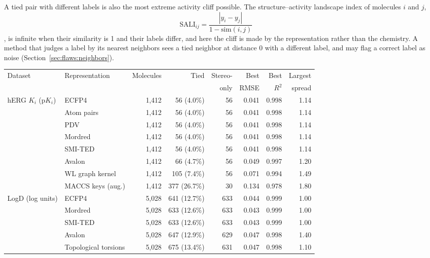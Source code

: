 A tied pair with different labels is also the most extreme activity cliff possible. The structure--activity landscape index of molecules $i$ and $j$,
\begin{equation}
\mathrm{SALI}_{ij} = \frac{|y_i - y_j|}{1 - \mathrm{sim}(i,j)}
\end{equation}
\citep{Guha2008}, is infinite when their similarity is 1 and their labels differ, and here the cliff is made by the representation rather than the chemistry. A method that judges a label by its nearest neighbors sees a tied neighbor at distance 0 with a different label, and may flag a correct label as noise (Section~\ref{sec:flaws:neighbors}).

\begin{table}[htbp]
\centering
\small
\setlength{\tabcolsep}{4pt}
\begin{adjustbox}{max width=\textwidth,max totalheight=0.78\textheight}
\begin{tabular}{llrrrrrr}
\toprule
Dataset & Representation & Molecules & Tied & Stereo- & Best & Best & Largest \\
 & & & & only & RMSE & $R^2$ & spread \\
\midrule
hERG $K_i$ (p$K_i$) & ECFP4 & 1,412 & 56 (4.0\%) & 56 & 0.041 & 0.998 & 1.14 \\
 & Atom pairs & 1,412 & 56 (4.0\%) & 56 & 0.041 & 0.998 & 1.14 \\
 & PDV & 1,412 & 56 (4.0\%) & 56 & 0.041 & 0.998 & 1.14 \\
 & Mordred & 1,412 & 56 (4.0\%) & 56 & 0.041 & 0.998 & 1.14 \\
 & SMI-TED & 1,412 & 56 (4.0\%) & 56 & 0.041 & 0.998 & 1.14 \\
 & Avalon & 1,412 & 66 (4.7\%) & 56 & 0.049 & 0.997 & 1.20 \\
 & WL graph kernel & 1,412 & 105 (7.4\%) & 56 & 0.071 & 0.994 & 1.49 \\
 & MACCS keys (aug.) & 1,412 & 377 (26.7\%) & 30 & 0.134 & 0.978 & 1.80 \\
\midrule
LogD (log units) & ECFP4 & 5,028 & 641 (12.7\%) & 633 & 0.044 & 0.999 & 1.00 \\
 & Mordred & 5,028 & 633 (12.6\%) & 633 & 0.043 & 0.999 & 1.00 \\
 & SMI-TED & 5,028 & 633 (12.6\%) & 633 & 0.043 & 0.999 & 1.00 \\
 & Avalon & 5,028 & 647 (12.9\%) & 629 & 0.047 & 0.998 & 1.40 \\
 & Topological torsions & 5,028 & 675 (13.4\%) & 631 & 0.047 & 0.998 & 1.10 \\

\end{tabular}
\end{adjustbox}
\end{table}
